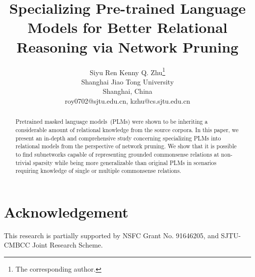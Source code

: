 \documentclass[11pt]{article}
\title{Specializing Pre-trained Language Models for Better Relational Reasoning via Network Pruning}
\author{Siyu Ren \hspace*{1cm} Kenny Q. Zhu\textsuperscript{\rm}\thanks{\hspace*{2mm}
The corresponding author.}\\
	Shanghai Jiao Tong University\\
	Shanghai, China\\
	roy0702@sjtu.edu.cn, kzhu@cs.sjtu.edu.cn}
\begin{document}
\maketitle
\begin{abstract}
Pretrained masked language models~(PLMs) 
were shown to be inheriting a considerable amount of relational knowledge 
from the source corpora. In this paper, we present an in-depth and comprehensive study concerning specializing PLMs into relational models from the perspective of network pruning. We show that it is possible to find subnetworks capable of representing grounded commonsense relations at non-trivial sparsity while being more generalizable than original PLMs in scenarios requiring knowledge of single or multiple commonsense relations. 
\end{abstract}






\section*{Acknowledgement}
This research is partially supported by NSFC Grant No. 91646205, and SJTU-CMBCC Joint Research Scheme.



\clearpage

\end{document}
